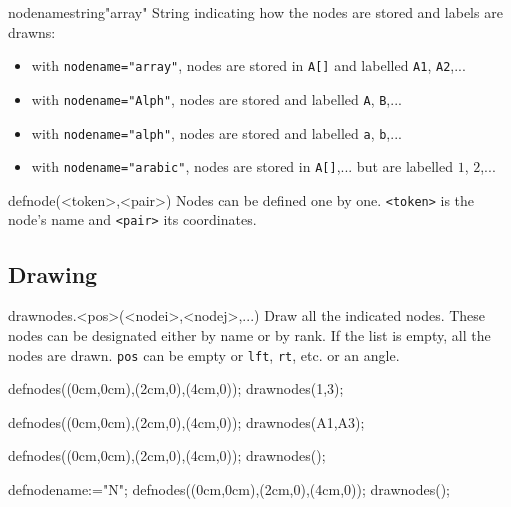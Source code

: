 \documentclass[11pt,a4paper,english]{article}
\begin{document}
\begin{mptparam}{nodename}{string}{"array"}
String indicating how the nodes are stored and labels are drawns:
\begin{itemize}[nosep]
\item with \verb|nodename="array"|, nodes are stored  in \verb|A[]| and labelled  \verb|A1|, \verb|A2|,...
\item with \verb|nodename="Alph"|, nodes are stored and labelled  \verb|A|, \verb|B|,...
\item with \verb|nodename="alph"|, nodes are stored and labelled  \verb|a|, \verb|b|,...
\item with \verb|nodename="arabic"|, nodes are stored  in \verb|A[]|,... but are labelled $1$, $2$,...
\end{itemize}
\end{mptparam}

\begin{rpdeclaration}{defnode(<token>,<pair>)}
Nodes can be defined one by one. \verb|<token>| is the node's name and \verb|<pair>| its coordinates.
\end{rpdeclaration}

\subsection{Drawing}

\begin{rplabel}{drawnodes.<pos>(<nodei>,<nodej>,...)}
Draw all the indicated nodes. These nodes can be designated either by name or by rank. If the list is empty, all the nodes are drawn. \verb|pos| can be empty or \verb|lft|, \verb|rt|, etc. or an angle.
\end{rplabel}

\begin{exemple}[lefthand ratio = 0.6]
defnodes((0cm,0cm),(2cm,0),(4cm,0));
drawnodes(1,3);
\end{exemple}

\begin{exemple}[lefthand ratio = 0.6]
defnodes((0cm,0cm),(2cm,0),(4cm,0));
drawnodes(A1,A3);
\end{exemple}

\begin{exemple}[lefthand ratio = 0.6]
defnodes((0cm,0cm),(2cm,0),(4cm,0));
drawnodes();
\end{exemple}


\begin{exemple}[lefthand ratio = 0.6]
defnodename:="N";
defnodes((0cm,0cm),(2cm,0),(4cm,0));
drawnodes();
\end{exemple}
\end{document}
